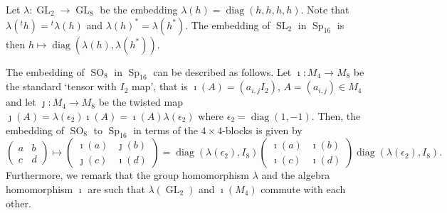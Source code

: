 \documentclass[12pt]{amsart}
\newcommand{\GL}{\operatorname{GL}}
\newcommand{\SL}{\operatorname{SL}}
\newcommand{\Sp}{\operatorname{Sp}}
\newcommand{\SO}{\operatorname{SO}}
\newcommand{\diag}{\operatorname{diag}}
\theoremstyle{remark}
\begin{document}
Let $\lambda:\GL_2\rightarrow \GL_8$ be the embedding $\lambda(h)=\diag(h,h,h,h)$. Note that $\lambda({}^t h)={}^t\lambda(h)$ and $\lambda(h)^*=\lambda(h^*)$. 
The embedding of $\SL_2$ in $\Sp_{16}$ is then $h\mapsto \diag(\lambda(h),\lambda(h^*))$. 

The embedding of $\SO_8$ in $\Sp_{16}$ can be described as follows. Let $\imath:M_4\rightarrow M_8$ be the standard `tensor with $I_2$ map', that is $\imath(A)=(a_{i,j}I_2)$, 
$A=(a_{i,j})\in M_4$ and let $\jmath:M_4\rightarrow M_8$ be the twisted map $\jmath(A)=\lambda(\epsilon_2)\imath(A)=\imath(A)\lambda(\epsilon_2)$ where $\epsilon_2=\diag(1,-1)$. 
Then, the embedding of $\SO_8$ to $\Sp_{16}$ in terms of the $4\times 4$-blocks is given by
\[
\begin{pmatrix} a & b \\ c & d\end{pmatrix} \mapsto \begin{pmatrix} \imath(a) & \jmath(b) \\ \jmath(c) & \imath(d)\end{pmatrix}=\diag(\lambda(\epsilon_2),I_8)    \begin{pmatrix} \imath(a) & \imath(b) \\ \imath(c) & \imath(d)\end{pmatrix} \diag(\lambda(\epsilon_2),I_8).
\]
Furthermore, we remark that the group homomorphism $\lambda$ and the algebra homomorphism $\imath$ are such that $\lambda(\GL_2)$ and $\imath(M_4)$ commute with each other. 
\end{document}
